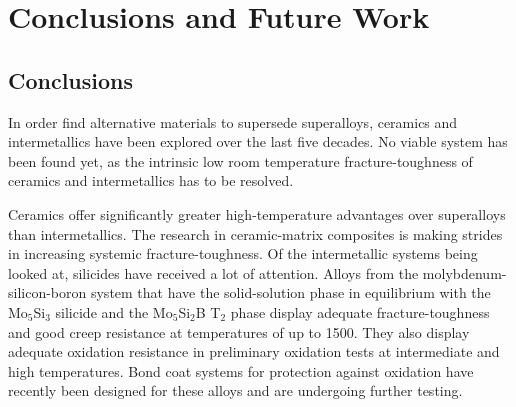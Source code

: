 
\chapter{Conclusions and Future Work}


\section{Conclusions}

In order find alternative materials to supersede superalloys, ceramics and intermetallics have been explored over the last five decades.  No viable system has been found yet, as the intrinsic low room temperature fracture-toughness of ceramics and intermetallics has to be resolved.

Ceramics offer significantly greater high-temperature advantages over superalloys than intermetallics.  The research in ceramic-matrix composites is making strides in increasing systemic fracture-toughness. 
Of the intermetallic systems being looked at, silicides have received a lot of attention.  Alloys from the molybdenum-silicon-boron system that have the solid-solution phase in equilibrium with the Mo$_5$Si$_3$ silicide and the Mo$_5$Si$_2$B T$_2$ phase display adequate fracture-toughness and good creep resistance at temperatures of up to 1500\celsius.  They also display adequate oxidation resistance in preliminary oxidation tests at intermediate and high temperatures.  Bond coat systems for protection against oxidation have recently been designed for these alloys and are undergoing further testing. 


